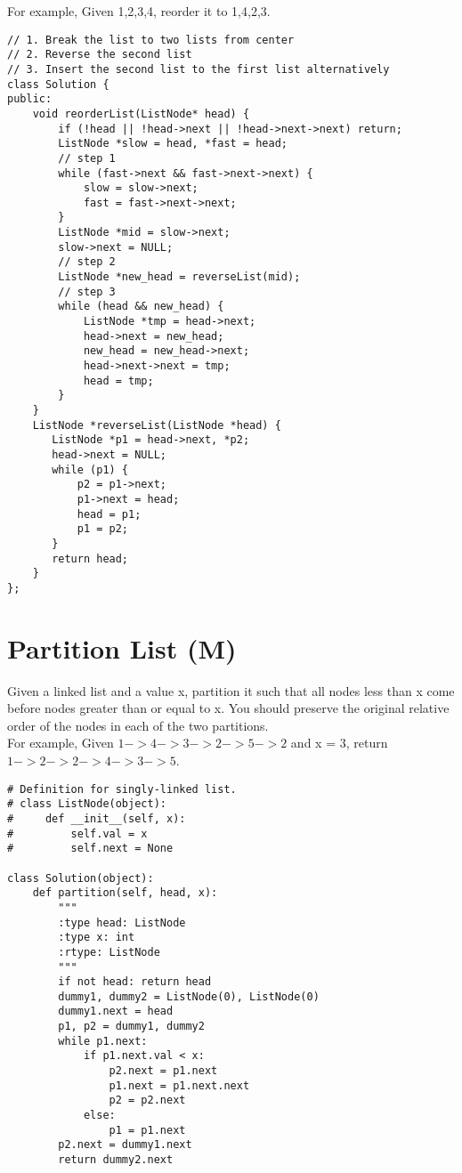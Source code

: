 For example,
Given {1,2,3,4}, reorder it to {1,4,2,3}. \\

\begin{lstlisting}
// 1. Break the list to two lists from center
// 2. Reverse the second list
// 3. Insert the second list to the first list alternatively
class Solution {
public:
    void reorderList(ListNode* head) {
        if (!head || !head->next || !head->next->next) return;
        ListNode *slow = head, *fast = head;
        // step 1
        while (fast->next && fast->next->next) {
            slow = slow->next;
            fast = fast->next->next;
        }
        ListNode *mid = slow->next;
        slow->next = NULL;
        // step 2
        ListNode *new_head = reverseList(mid);
        // step 3
        while (head && new_head) {
            ListNode *tmp = head->next;
            head->next = new_head;
            new_head = new_head->next;
            head->next->next = tmp;
            head = tmp;
        }
    }
    ListNode *reverseList(ListNode *head) {
       ListNode *p1 = head->next, *p2;
       head->next = NULL;
       while (p1) {
           p2 = p1->next;
           p1->next = head;
           head = p1;
           p1 = p2;
       }
       return head;
    }
};
\end{lstlisting}


\section{Partition List (M)}
Given a linked list and a value x, partition it such that all nodes less than x come before nodes greater than or equal to x. You should preserve the original relative order of the nodes in each of the two partitions.\\

For example,
Given $1->4->3->2->5->2$ and x = 3,
return $1->2->2->4->3->5$. \\

\begin{lstlisting}
# Definition for singly-linked list.
# class ListNode(object):
#     def __init__(self, x):
#         self.val = x
#         self.next = None

class Solution(object):
    def partition(self, head, x):
        """
        :type head: ListNode
        :type x: int
        :rtype: ListNode
        """
        if not head: return head
        dummy1, dummy2 = ListNode(0), ListNode(0)
        dummy1.next = head
        p1, p2 = dummy1, dummy2
        while p1.next:
            if p1.next.val < x:
                p2.next = p1.next
                p1.next = p1.next.next
                p2 = p2.next
            else:
                p1 = p1.next
        p2.next = dummy1.next
        return dummy2.next
\end{lstlisting}

